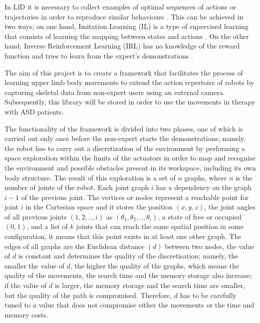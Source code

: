 \documentclass[thesis]{mas_proposal}
\begin{document}
\begin{itemize}
    In LfD it is necessary to collect examples of optimal sequences of actions or trajectories in order to reproduce similar behaviours \cite{Piot2017}. This can be achieved in two ways; on one hand, Imitation Learning (IL) is a type of supervised learning that consists of learning the mapping between states and actions \cite{Dinyari2020}. On the other hand, Inverse Reinforcement Learning (IRL) has no knowledge of the reward function and tries to learn from the expert's demonstrations \cite{reddy2019}.
    
    The aim of this project is to create a framework that facilitates the process of learning upper limb body movements to extend the action repertoire of robots by capturing skeletal data from non-expert users using an external camera. Subsequently, this library will be stored in order to use the movements in therapy with ASD patients.
    
    The functionality of the framework is divided into two phases, one of which is carried out only once before the non-expert starts the demonstrations; namely, the robot has to carry out a discretization of the environment by performing a space exploration within the limits of the actuators in order to map and recognise the environment and possible obstacles present in its workspace, including its own body structure. The result of this exploration is a set of $n$ graphs, where $n$ is the number of joints of the robot. Each joint graph $i$ has a dependency on the graph $i-1$ of the previous joint. The vertices or nodes represent a reachable point for joint $i$ in the Cartesian space and it stores the position $(x, y, z)$, the joint angles of all previous joints $(1,2,..,i)$ as $(\theta_1, \theta_2,..,\theta_i)$, a state of free or occupied $(0, 1)$, and a list of $k$ joints that can reach the same spatial position in some configuration, it means that this point exists in at least one other graph. 	
 	The edges of all graphs are the Euclidean distance $(d)$ between two nodes, the value of $d$ is constant and determines the quality of the discretisation; namely, the smaller the value of $d$, the higher the quality of the graphs, which means the quality of the movements, the search time and the memory storage also increase; if the value of $d$ is larger, the memory storage and the search time are smaller, but the quality of the path is compromised. Therefore, $d$ has to be carefully tuned to a value that does not compromise either the movements or the time and memory costs.
 	

\end{itemize}
\end{document}
